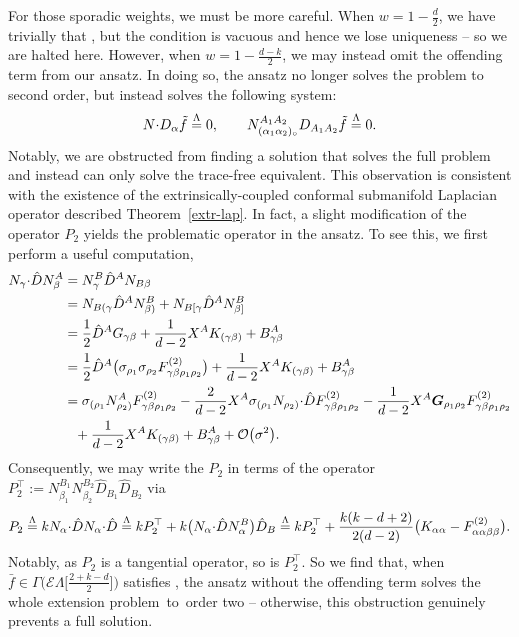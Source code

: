 \documentclass[pdftex]{sigma}
\numberwithin{equation}{section}
\newcommand{\ce}{\mathcal{E}}
\newcommand{\bG}{\boldsymbol{G}}
\newcommand{\hd }{\hat{D}}
\renewcommand{\=}{\stackrel \Lambda =}
\newcommand{\csdot}{\hspace{-0.75mm} \cdot \hspace{-0.75mm}}
\begin{document}
For those sporadic weights, we must be more careful. When $w = 1-\frac{d}{2}$, we have trivially that \smash{$N_{\alpha} \csdot D f \= 0$}, but the condition is vacuous and hence we lose uniqueness -- so we are halted here. However, when $w = 1-\frac{d-k}{2}$, we may instead omit the offending term from our ansatz. In doing so, the ansatz no longer solves the problem to second order, but instead solves the following system:
\[N \csdot D_{\alpha} \tilde{f} \= 0 , \qquad N^{A_1 A_2}_{(\alpha_1 \alpha_2)_\circ} D_{A_1 A_2} \tilde{f} \= 0 .\]
Notably, we are obstructed from finding a solution that solves the full problem and instead can only solve the trace-free equivalent. This observation is consistent with the existence of the extrinsically-coupled conformal submanifold Laplacian operator described Theorem~\ref{extr-lap}.
In fact, a slight modification of the operator $P_{2}$ yields the problematic operator in the ansatz. To see this, we first perform a useful computation,
\begin{align*}
N_{\gamma} \csdot \hd N^A_{\beta} &{}= N^B_{\gamma} \hd^A N_{B \beta} \\
&{}= N_{B(\gamma} \hd^A N^B_{\beta)} + N_{B[\gamma} \hd^A N^B_{\beta]} \\
&{}= \frac{1}{2} \hd^A G_{\gamma \beta} + \frac{1}{d-2} X^A K_{(\gamma \beta)} + B^A_{\gamma \beta} \\
&{}= \frac{1}{2} \hd^A \bigl(\sigma_{\rho_1} \sigma_{\rho_2} F^{(2)}_{\gamma \beta \rho_1 \rho_2}\bigr) + \frac{1}{d-2} X^A K_{(\gamma \beta)} + B^A_{\gamma \beta} \\
&{}= \sigma_{(\rho_1} N^A_{\rho_2)} F^{(2)}_{\gamma \beta \rho_1 \rho_2} - \frac{2}{d-2} X^A \sigma_{(\rho_1} N_{\rho_2)} \csdot \hd F^{(2)}_{\gamma \beta \rho_1 \rho_2} - \frac{1}{d-2} X^A \bG_{\rho_1 \rho_2} F^{(2)}_{\gamma \beta \rho_1 \rho_2} \\
&\phantom{=} + \frac{1}{d-2} X^A K_{(\gamma \beta)} + B^A_{\gamma \beta} + \mathcal{O}\bigl(\sigma^2\bigr) .
\end{align*}
Consequently, we may write the $P_{2}$ in terms of the operator $P_2^\top := N^{B_1}_{\beta_1} N^{B_2}_{\beta_2} \hd_{B_1} \hd_{B_2}$ via
\begin{align*}
P_{2} \=k N_{\alpha} \csdot \hd N_{\alpha} \csdot \hd
\= k P_2^\top + k \bigl(N_{\alpha} \csdot \hd N^B_{\alpha}\bigr) \hd_B
\= k P_2^\top + \frac{k(k-d+2)}{2(d-2)} \bigl(K_{\alpha \alpha} - F^{(2)}_{\alpha \alpha \beta \beta}\bigr) .
\end{align*}
Notably, as $P_{2}$ is a tangential operator, so is $P_2^\top$. So we find that, when $\bar{f} \in \Gamma\bigl(\ce \Lambda\bigl[\frac{2+k-d}{2}\bigr]\bigr)$ satisfies \smash{$P_2^\top \bar{f} \= 0$}, the ansatz without the offending term solves the whole extension problem~to~order two -- otherwise, this obstruction genuinely prevents a full solution.
\end{document}
